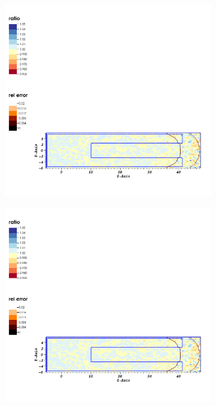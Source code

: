 \begin{figure}
    \begin{subfigure}{0.1\textwidth}
        \centering
        \includegraphics[scale=0.35, trim={0cm 20cm 31cm 2cm}, clip]{figs/ratio_nflux.png}
    \end{subfigure}
    \begin{subfigure}{0.1\textwidth}
        \centering
        \includegraphics[scale=0.35, trim={0cm 6.1cm 32cm 15cm}, clip]{figs/ratio_nflux.png}

\end{subfigure}
\end{figure}
